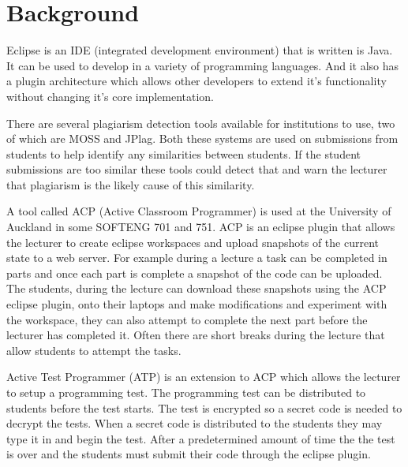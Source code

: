 \documentclass[twocolumn]{article}
\begin{document}
\section{Background}
Eclipse is an IDE (integrated development environment) that is written is Java.
It can be used to develop in a variety of programming languages. And it also has
a plugin architecture which allows other developers to extend it's functionality
without changing it's core implementation.

There are several plagiarism detection tools available for institutions to use,
two of which are MOSS\cite{schleimer2003winnowing} and
JPlag\cite{lutz2000jplag}. Both these systems are used on submissions from
students to help identify any similarities between students. If the student
submissions are too similar these tools could detect that and warn the lecturer
that plagiarism is the likely cause of this similarity.

A tool called ACP (Active Classroom Programmer)\cite{giacaman2015active} is used
at the University of Auckland in some SOFTENG 701 and 751. ACP is an eclipse
plugin that allows the lecturer to create eclipse workspaces and upload
snapshots of the current state to a web server. For example during a lecture a
task can be completed in parts and once each part is complete a snapshot of the
code can be uploaded. The students, during the lecture can download these
snapshots using the ACP eclipse plugin, onto their laptops and make
modifications and experiment with the workspace, they can also attempt to
complete the next part before the lecturer has completed it. Often there are
short breaks during the lecture that allow students to attempt the tasks.

Active Test Programmer (ATP) is an extension to ACP which allows the lecturer to
setup a programming test. The programming test can be distributed to students
before the test starts. The test is encrypted so a secret code is needed to
decrypt the tests. When a secret code is distributed to the students they may
type it in and begin the test. After a predetermined amount of time the the test
is over and the students must submit their code through the eclipse plugin.

\end{document}
